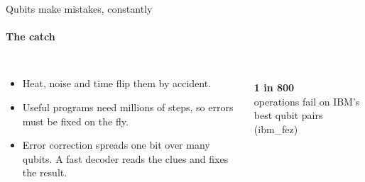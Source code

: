\documentclass[aspectratio=169,11pt]{beamer}
\newcommand{\hl}[1]{{\color{accent}#1}}
\newcommand{\dimnote}[1]{{\color{dim}\small #1}}
\newcommand{\bignum}[2]{{\color{#1}\fontsize{40}{44}\selectfont\bfseries #2}}
\begin{document}
\begin{frame}{Qubits make mistakes, constantly}\framesubtitle{The catch}
  \begin{columns}[c]
    \begin{itemize}\setlength\itemsep{0.8em}
      \item Heat, noise and time flip them by accident.
      \item Useful programs need millions of steps, so errors must be fixed on the fly.
      \item \hl{Error correction} spreads one bit over many qubits. A fast \hl{decoder} reads the clues and fixes the result.
    \end{itemize}
    \centering
    \\[1.2em]
    \bignum{white}{1 in 800}\\[0.3em]
    \dimnote{operations fail on IBM's best qubit pairs (ibm\_fez)}
  \end{columns}
\end{frame}
\end{document}
